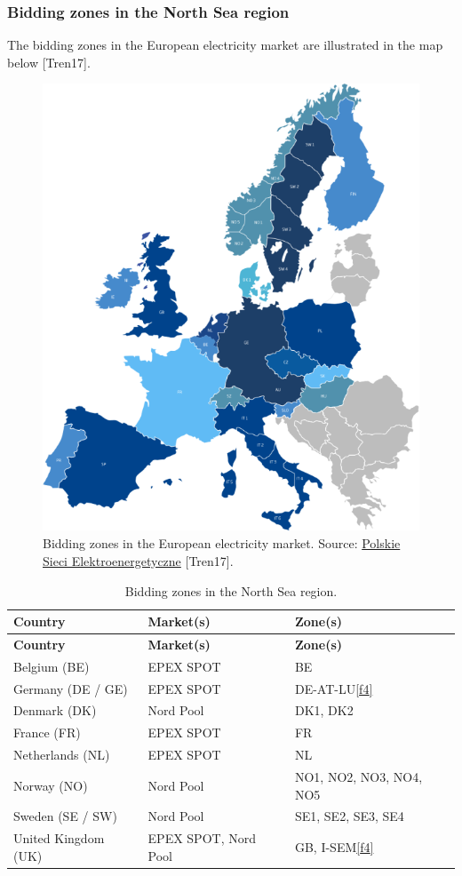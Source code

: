 \hypertarget{bidding-zones-in-the-north-sea-region}{%
\subsubsection{Bidding zones in the North Sea
region}\label{bidding-zones-in-the-north-sea-region}}

The bidding zones in the European electricity market are illustrated in
the map below {[}Tren17{]}.

\begin{figure}
\centering
\includegraphics{images/market-map.png}
\caption{Bidding zones in the European electricity market. Source:
\href{http://raport.pse.pl/en/trends-and-market-context}{Polskie Sieci
Elektroenergetyczne} {[}Tren17{]}.}
\end{figure}

\begin{longtable}[]{@{}lll@{}}
\caption{Bidding zones in the North Sea region.}\tabularnewline
\toprule
\textbf{Country} & \textbf{Market(s)} & \textbf{Zone(s)}\tabularnewline
\midrule
\endfirsthead
\toprule
\textbf{Country} & \textbf{Market(s)} & \textbf{Zone(s)}\tabularnewline
\midrule
\endhead
Belgium (BE) & EPEX SPOT & BE\tabularnewline
Germany (DE / GE) & EPEX SPOT &
DE-AT-LU\protect\hyperlink{f4}{{[}f4{]}}\tabularnewline
Denmark (DK) & Nord Pool & DK1, DK2\tabularnewline
France (FR) & EPEX SPOT & FR\tabularnewline
Netherlands (NL) & EPEX SPOT & NL\tabularnewline
Norway (NO) & Nord Pool & NO1, NO2, NO3, NO4, NO5\tabularnewline
Sweden (SE / SW) & Nord Pool & SE1, SE2, SE3, SE4\tabularnewline
United Kingdom (UK) & EPEX SPOT, Nord Pool & GB,
I-SEM\protect\hyperlink{f4}{{[}f4{]}}\tabularnewline
\bottomrule
\end{longtable}

